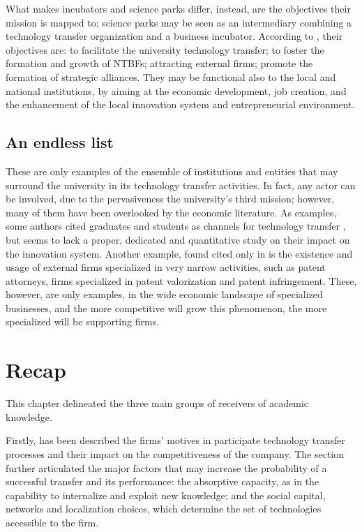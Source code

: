 What makes incubators and science parks differ, instead, are the objectives their mission is mapped to; science parks may be seen as an intermediary combining a technology transfer organization and a business incubator. According to \citet{Siegel2003}, their objectives are: to facilitate the university technology transfer; to foster the formation and growth of NTBFs; attracting external firms; promote the formation of strategic alliances. They may be functional also to the local and national institutions, by aiming at the economic development, job creation, and the enhancement of the local innovation system and entrepreneurial environment. 

\subsection{An endless list}

These are only examples of the ensemble of institutions and entities that may surround the university in its technology transfer activities. In fact, any actor can be involved, due to the pervasiveness the university's third mission; however, many of them have been overlooked by the economic literature. As examples, some authors cited graduates and students as channels for technology transfer \citep{Segal1986, Audretsch2004,OShea2005,Guerrero2014}, but seems to lack a proper, dedicated and quantitative study on their impact on the innovation system. Another example, found cited only in \citet{Balderi2010} is the existence and usage of external firms specialized in very narrow activities, such as patent attorneys, firms specialized in patent valorization and patent infringement. These, however, are only examples, in the wide economic landscape of specialized businesses, and the more competitive will grow this phenomenon, the more specialized will be supporting firms. 

\section{Recap}

This chapter delineated the three main groups of receivers of academic knowledge.

Firstly, has been described the firms' motives in participate technology transfer processes and their impact on the competitiveness of the company. The section further articulated the major factors that may increase the probability of a successful transfer and its performance: the absorptive capacity, as in the capability to internalize and exploit new knowledge; and the social capital, networks and localization choices, which determine the set of technologies accessible to the firm.

